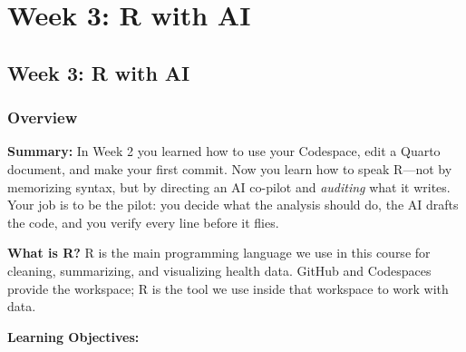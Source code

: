 \documentclass[
  letterpaper,
  DIV=11,
  numbers=noendperiod,
  oneside]{scrreprt}
\begin{document}
\part{Week 3: R with AI}

\chapter*{Week 3: R with AI}\label{week-3-r-with-ai-1}


\section*{Overview}\label{overview-2}


\textbf{Summary:} In Week 2 you learned how to use your Codespace, edit
a Quarto document, and make your first commit. Now you learn how to
speak R---not by memorizing syntax, but by directing an AI co-pilot and
\emph{auditing} what it writes. Your job is to be the pilot: you decide
what the analysis should do, the AI drafts the code, and you verify
every line before it flies.

\textbf{What is R?} R is the main programming language we use in this
course for cleaning, summarizing, and visualizing health data. GitHub
and Codespaces provide the workspace; R is the tool we use inside that
workspace to work with data.

\textbf{Learning Objectives:}
\end{document}
